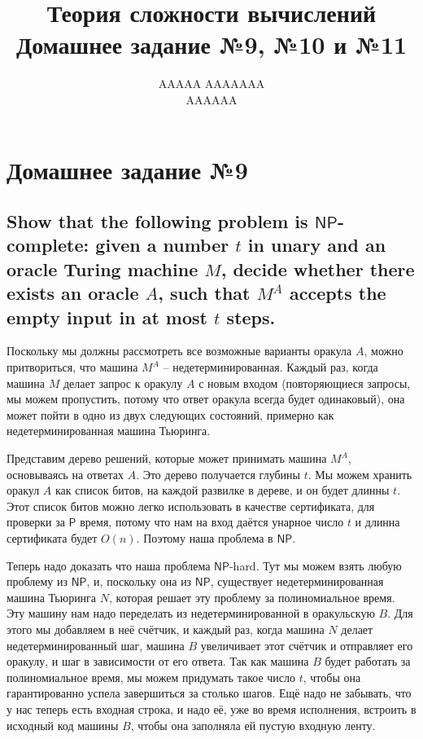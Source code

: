 \documentclass{article}
\title{Теория сложности вычислений \\ Домашнее задание №9, №10 и №11}
\author{AAAAA AAAAAAA \\ AAAAAA}
\newcommand{\NP}{\ensuremath{\mathsf{NP}}}
\renewcommand{\P}{\ensuremath{\mathsf{P}}}
\begin{document}
  \maketitle

  \setcounter{section}{8}
  \section{Домашнее задание №9}
  \setcounter{subsection}{8}
  \subsection{Show that the following problem is \NP-complete: given a number $t$ in unary and an oracle Turing machine $M$, decide whether there exists an oracle $A$, such that $M^A$ accepts the empty input in at most $t$ steps.}
  Поскольку мы должны рассмотреть все возможные варианты оракула $A$, можно притвориться, что машина $M^A$ -- недетерминированная.
  Каждый раз, когда машина $M$ делает запрос к оракулу $A$ с новым входом (повторяющиеся запросы, мы можем пропустить, потому что ответ оракула всегда будет одинаковый), она может пойти в одно из двух следующих состояний, примерно как недетерминированная машина Тьюринга.

  Представим дерево решений, которые может принимать машина $M^A$, основываясь на ответах $A$.
  Это дерево получается глубины $t$.
  Мы можем хранить оракул $A$ как список битов, на каждой развилке в дереве, и он будет длинны $t$.
  Этот список битов можно легко использовать в качестве сертификата, для проверки за \P{} время, потому что нам на вход даётся унарное число $t$ и длинна сертификата будет $O(n)$.
  Поэтому наша проблема в \NP.

  Теперь надо доказать что наша проблема \NP-hard.
  Тут мы можем взять любую проблему из \NP, и, поскольку она из \NP, существует недетерминированная машина Тьюринга $N$, которая решает эту проблему за полиномиальное время.
  Эту машину нам надо переделать из недетерминированной в оракульскую $B$.
  Для этого мы добавляем в неё счётчик, и каждый раз, когда машина $N$ делает недетерминированный шаг, машина $B$ увеличивает этот счётчик и отправляет его оракулу, и шаг в зависимости от его ответа.
  Так как машина $B$ будет работать за полиномиальное время, мы можем придумать такое число $t$, чтобы она гарантированно успела завершиться за столько шагов.
  Ещё надо не забывать, что у нас теперь есть входная строка, и надо её, уже во время исполнения, встроить в исходный код машины $B$, чтобы она заполняла ей пустую входную ленту.
\end{document}
